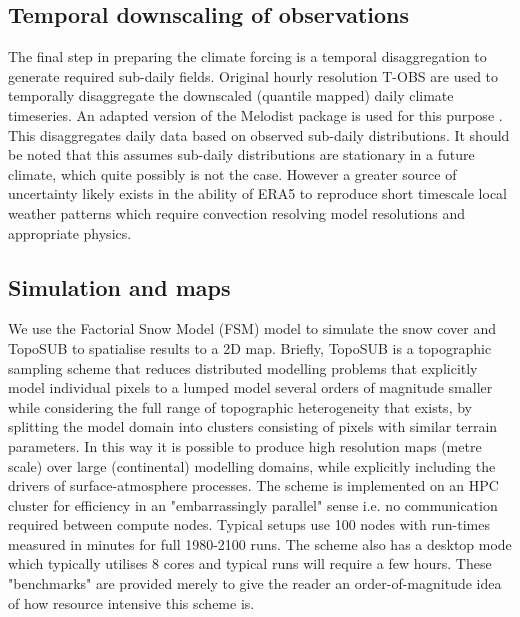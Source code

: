 \documentclass[hess, manuscript]{copernicus}
\begin{document}
\subsection{Temporal downscaling of observations}
The final step in preparing the climate forcing is a temporal disaggregation to generate required sub-daily fields. Original hourly resolution T-OBS are used to temporally disaggregate the downscaled (quantile mapped) daily climate timeseries. An adapted version of the Melodist package is used for this purpose \citep{Forster2016-xx}. This disaggregates daily data based on observed sub-daily distributions. It should be noted that this assumes sub-daily distributions are stationary in a future climate, which quite possibly is not the case. However a greater source of uncertainty likely exists in the ability of ERA5 to reproduce short timescale local weather patterns which require convection resolving model resolutions \citep{Liu2017-md} and appropriate physics. %

\subsection{Simulation and maps}
We use the Factorial Snow Model (FSM) model \citep{Essery2015-jv} to simulate the snow cover and TopoSUB \citep{Fiddes2012-td} to spatialise results to a 2D map. Briefly, TopoSUB is a topographic sampling scheme that reduces distributed modelling problems that explicitly model individual pixels to a lumped model several orders of magnitude smaller while considering the full range of topographic heterogeneity that exists, by splitting the model domain into clusters consisting of pixels with similar terrain parameters. In this way it is possible to produce high resolution maps (metre scale) over large (continental) modelling domains, while explicitly including the drivers of surface-atmosphere processes.
The scheme is implemented on an HPC cluster for efficiency in an "embarrassingly parallel" sense i.e. no communication required between compute nodes. Typical setups use 100 nodes with run-times measured in minutes for full 1980-2100 runs. The scheme also has a desktop mode which typically utilises 8 cores and typical runs will require a few hours. These "benchmarks" are provided merely to give the reader an order-of-magnitude idea of how resource intensive this scheme is.
\end{document}
